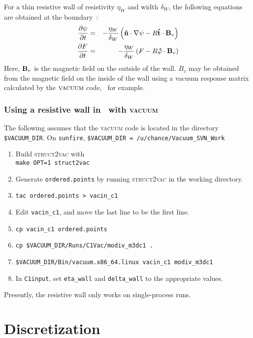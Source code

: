 For a thin resistive wall of resistivity $\eta_W$ and width
$\delta_W$, the following equations are obtained at the
boundary~\cite{Jardin10}:
\begin{eqnarray}
  \frac{\partial \psi}{\partial t} & = & -\frac{\eta_W}{\delta_W} \left(\mathbf{\hat{n}} \cdot
  \nabla \psi - R \mathbf{\hat{t}} \cdot \mathbf{B}_v \right)
    \\
  \frac{\partial F}{\partial t} & = & -\frac{\eta_W}{\delta_W} \left(F - R \mathbf{\hat{\varphi}} \cdot
  \mathbf{B}_v \right)
\end{eqnarray}
Here, $\mathbf{B}_v$ is the magnetic field on the outside of the wall.  $B_v$
may be obtained from the magnetic field on the inside of the wall
using a vacuum response matrix calculated by the $\textsc{vacuum}$
code,~\cite{Chance10} for example.

\subsubsection{Using a resistive wall in \codename\ with \textsc{vacuum}}

The following assumes that the \textsc{vacuum} code is located in the
directory \texttt{\$VACUUM\_DIR}.  On \texttt{sunfire},
\texttt{\$VACUUM\_DIR = /u/chance/Vacuum\_SVN\_Work}

\begin{enumerate}
\item Build \textsc{struct2vac} with\\
  \texttt{make OPT=1 struct2vac}
\item Generate \texttt{ordered.points} by running \textsc{struct2vac}
  in the working directory.
\item \texttt{tac ordered.points > vacin\_c1}
\item Edit \texttt{vacin\_c1}, and move the last line to be the first
  line.
\item \texttt{cp vacin\_c1 ordered.points}
\item \texttt{cp \$VACUUM\_DIR/Runs/C1Vac/modiv\_m3dc1 .}
\item \texttt{\$VACUUM\_DIR/Bin/vacuum.x86\_64.linux vacin\_c1 modiv\_m3dc1}
\item In \texttt{C1input}, set \texttt{eta\_wall} and
  \texttt{delta\_wall} to the appropriate values.
\end{enumerate}

Presently, the resistive wall only works on single-process runs.



\section{Discretization}

